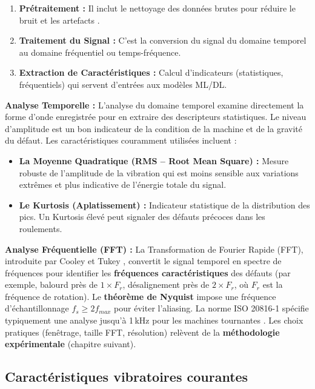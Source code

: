 \begin{enumerate}
\item \textbf{Prétraitement :} Il inclut le nettoyage des données brutes pour réduire le bruit et les artefacts \cite{bagri2024}.
\item \textbf{Traitement du Signal :} C'est la conversion du signal du domaine temporel au domaine fréquentiel ou temps-fréquence.
\item \textbf{Extraction de Caractéristiques :} Calcul d'indicateurs (statistiques, fréquentiels) qui servent d'entrées aux modèles ML/DL.
\end{enumerate}

\textbf{Analyse Temporelle :} L'analyse du domaine temporel examine directement la forme d'onde enregistrée pour en extraire des descripteurs statistiques. Le niveau d'amplitude est un bon indicateur de la condition de la machine et de la gravité du défaut. Les caractéristiques couramment utilisées incluent :
\begin{itemize}
\item \textbf{La Moyenne Quadratique (RMS -- Root Mean Square) :} Mesure robuste de l'amplitude de la vibration qui est moins sensible aux variations extrêmes et plus indicative de l'énergie totale du signal.
\item \textbf{Le Kurtosis (Aplatissement) :} Indicateur statistique de la distribution des pics. Un Kurtosis élevé peut signaler des défauts précoces dans les roulements.
\end{itemize}

\textbf{Analyse Fréquentielle (FFT) :} La Transformation de Fourier Rapide (FFT), introduite par Cooley et Tukey \cite{cooley1965}, convertit le signal temporel en spectre de fréquences pour identifier les \textbf{fréquences caractéristiques} des défauts (par exemple, balourd près de $1 \times F_r$, désalignement près de $2 \times F_r$, où $F_r$ est la fréquence de rotation). Le \textbf{théorème de Nyquist} impose une fréquence d'échantillonnage $f_s \geq 2f_{max}$ pour éviter l'aliasing. La norme ISO 20816-1 spécifie typiquement une analyse jusqu'à 1\,kHz pour les machines tournantes \cite{iso20816-1}. Les choix pratiques (fenêtrage, taille FFT, résolution) relèvent de la \textbf{méthodologie expérimentale} (chapitre suivant).

\subsection{Caractéristiques vibratoires courantes}

